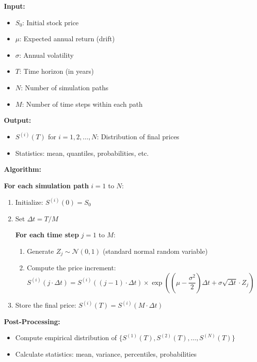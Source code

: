 \documentclass[12pt,a4paper]{article}
\begin{document}
\begin{tcolorbox}[colback=blue!10, colframe=blue!50, title=Monte Carlo Algorithm for GBM]

\textbf{Input:}
\begin{itemize}
    \item $S_0$: Initial stock price
    \item $\mu$: Expected annual return (drift)
    \item $\sigma$: Annual volatility
    \item $T$: Time horizon (in years)
    \item $N$: Number of simulation paths
    \item $M$: Number of time steps within each path
\end{itemize}

\textbf{Output:}
\begin{itemize}
    \item $S^{(i)}(T)$ for $i = 1, 2, \ldots, N$: Distribution of final prices
    \item Statistics: mean, quantiles, probabilities, etc.
\end{itemize}

\textbf{Algorithm:}

\textbf{For each simulation path} $i = 1$ to $N$:
\begin{enumerate}
    \item Initialize: $S^{(i)}(0) = S_0$
    \item Set $\Delta t = T/M$
    
    \textbf{For each time step} $j = 1$ to $M$:
    \begin{enumerate}
        \item Generate $Z_j \sim \mathcal{N}(0, 1)$ (standard normal random variable)
        \item Compute the price increment:
        \begin{equation}
        S^{(i)}(j \cdot \Delta t) = S^{(i)}((j-1) \cdot \Delta t) \times \exp\left(\left(\mu - \frac{\sigma^2}{2}\right)\Delta t + \sigma\sqrt{\Delta t} \cdot Z_j\right)
        \end{equation}
        \end{enumerate}
    
    \item Store the final price: $S^{(i)}(T) = S^{(i)}(M \cdot \Delta t)$
\end{enumerate}

\textbf{Post-Processing:}
\begin{itemize}
    \item Compute empirical distribution of $\{S^{(1)}(T), S^{(2)}(T), \ldots, S^{(N)}(T)\}$
    \item Calculate statistics: mean, variance, percentiles, probabilities
\end{itemize}

\end{tcolorbox}
\end{document}

